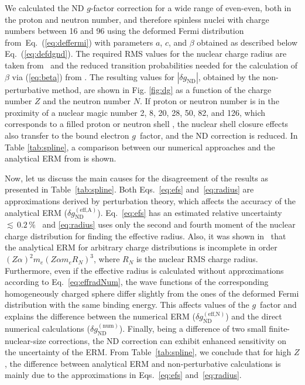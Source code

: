 We calculated the ND $g$-factor correction for a wide range of even-even, both in the proton and neutron number, and therefore spinless nuclei with charge numbers between 16 and 96 using the deformed Fermi distribution from~Eq.~(\ref{eq:deffermi}) with parameters $a$, $c$, and $\beta$ obtained as described below Eq.~(\ref{eq:defdgnd}). The required RMS values for the nuclear charge radius are taken from~\cite{Angeli2013} and the reduced transition probabilities needed for the calculation of $\beta$ via (\ref{eq:beta}) from \cite{ENSDF}. The resulting values for $|\delta g_{\text{ND}}|$, obtained by the non-perturbative method, are shown in Fig. \ref{fig:dg} as a function of the charge number $Z$ and the neutron number $N$. If proton or neutron number is in the proximity of a nuclear magic number 2, 8, 20, 28, 50, 82, and 126, which corresponds to a filled proton or neutron shell \cite{Ring}, the nuclear shell closure effects also transfer to the bound electron $g$~factor, and the ND correction is reduced. In Table \ref{tab:spline}, a comparison between our numerical approaches and the analytical ERM from \cite{jacek2012} is shown.

Now, let us discuss the main causes for the disagreement of the results as presented in Table~\ref{tab:spline}. Both Eqs.~\eqref{eq:efs} and~\eqref{eq:radius} are approximations derived by perturbation theory, which affects the accuracy of the analytical ERM ($\delta g_{\text{ND}}^{(\text{eff,A})}$). Eq.~\eqref{eq:efs} has an estimated relative uncertainty ${\scriptstyle\lesssim}\,0.2\,\%$~\cite{Shabaev1993} and \eqref{eq:radius} uses only the second and fourth moment of the nuclear charge distribution for finding the effective radius. Also, it was shown in~\cite{karshenboim2018} that the analytical ERM for arbitrary charge distributions is incomplete in order $(Z\alpha)^2m_e(Z\alpha m_e R_N)^3$, where $R_N$ is the nuclear RMS charge radius. Furthermore, even if the effective radius is calculated without approximations according to Eq.~\eqref{eq:effradNum}, the wave functions of the corresponding homogeneously charged sphere differ slightly from the ones of the deformed Fermi distribution with the same binding energy. This affects values of the $g$~factor and explains the difference between the numerical ERM ($\delta g_{\text{ND}}^{(\text{eff,N})}$) and the direct numerical calculations ($\delta g_{\text{ND}}^{(\text{num})}$). 
Finally, being a difference of two small finite-nuclear-size corrections, the ND correction can exhibit enhanced sensitivity on the uncertainty of the ERM.
From Table~\ref{tab:spline}, we conclude that for high $Z$, the difference between analytical ERM and non-perturbative calculations is mainly due to the approximations in Eqs.~\eqref{eq:efs} and~\eqref{eq:radius}.

